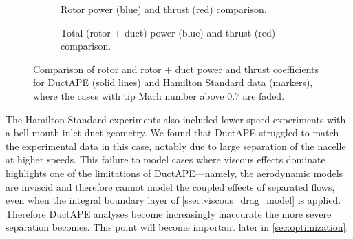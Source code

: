\begin{figure}[h!]
     \centering
     \begin{subfigure}[t]{0.49\textwidth}
         \centering
        
        \caption{Rotor power (blue) and thrust (red) comparison.}
        \label{fig:highspeedcpct_rotor}
     \end{subfigure}
\hfill
     \begin{subfigure}[t]{0.49\textwidth}
         \centering
         
         \caption{Total (rotor + duct) power (blue) and thrust (red) comparison.}
        \label{fig:highspeedcpct_total}
     \end{subfigure}
     \caption[DuctAPE validation power and thrust plots.]{Comparison of rotor and rotor + duct power and thrust coefficients for DuctAPE (solid lines) and Hamilton Standard data (markers), where the cases with tip Mach number above 0.7 are faded.}
\label{fig:highspeedcpct}
\end{figure}


The Hamilton-Standard experiments also included lower speed experiments with a bell-mouth inlet duct geometry.
%
We found that DuctAPE struggled to match the experimental data in this case, notably due to large separation of the nacelle at higher speeds.
%
This failure to model cases where viscous effects dominate highlights one of the limitations of DuctAPE---namely, the aerodynamic models are inviscid and therefore cannot model the coupled effects of separated flows, even when the integral boundary layer of \cref{ssec:viscous_drag_model} is applied.
%
Therefore DuctAPE analyses become increasingly inaccurate the more severe separation becomes.
%
This point will become important later in \cref{sec:optimization}.

